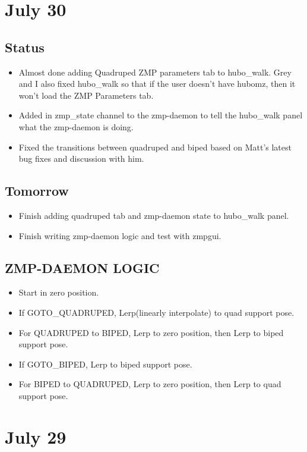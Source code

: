 \documentclass[letterpaper, 10 pt]{report}
\begin{document}
\section*{July 30}
\subsection*{Status}
\begin{itemize}
\item Almost done adding Quadruped ZMP parameters tab to hubo\_walk. Grey and I also fixed hubo\_walk so that if the user doesn't have hubomz, then it won't load the ZMP Parameters tab.
\item Added in zmp\_state channel to the zmp-daemon to tell the hubo\_walk panel what the zmp-daemon is doing.
\item Fixed the transitions between quadruped and biped based on Matt's latest bug fixes and discussion with him.
\end{itemize}
\subsection*{Tomorrow}
\begin{itemize}
\item Finish adding quadruped tab and zmp-daemon state to hubo\_walk panel.
\item Finish writing zmp-daemon logic and test with zmpgui.
\end{itemize}
\subsection*{ZMP-DAEMON LOGIC}
\begin{itemize}
\item Start in zero position.
\item If GOTO\_QUADRUPED, Lerp(linearly interpolate) to quad support pose.
\item For QUADRUPED to BIPED, Lerp to zero position, then Lerp to biped support pose.
\item If GOTO\_BIPED, Lerp to biped support pose.
\item For BIPED to QUADRUPED, Lerp to zero position, then Lerp to quad support pose.
\end{itemize}

\section*{July 29}
\end{document}
